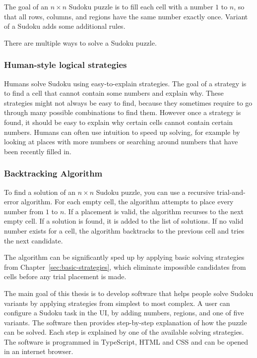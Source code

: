 

The goal of an $n \times n$ Sudoku puzzle is to fill each cell with a number $1$ to $n$,
so that all rows, columns, and regions have the same number exactly once.
Variant of a Sudoku adds some additional rules.


There are multiple ways to solve a Sudoku puzzle.

\subsubsection*{Human-style logical strategies}

Humans solve Sudoku using easy-to-explain strategies.
The goal of a strategy is to find a cell that cannot contain some numbers and explain why.
These strategies might not always be easy to find,
because they sometimes require to go through many possible combinations to find them.
However once a strategy is found, it should be easy to explain why certain cells cannot contain certain numbers.
Humans can often use intuition to speed up solving,
for example by looking at places with more numbers or searching around numbers that have been recently filled in.

\subsubsection*{Backtracking Algorithm}

To find a solution of an $n \times n$ Sudoku puzzle, you can use a recursive trial-and-error algorithm.
For each empty cell, the algorithm attempts to place every number from $1$ to $n$.
If a placement is valid, the algorithm recurses to the next empty cell.
If a solution is found, it is added to the list of solutions.
If no valid number exists for a cell, the algorithm backtracks to the previous cell and tries the next candidate.

The algorithm can be significantly sped up by applying basic solving strategies from Chapter~\ref{sec:basic-strategies},
which eliminate impossible candidates from cells before any trial placement is made.


The main goal of this thesis is to develop software that helps people solve Sudoku variants
by applying strategies from simplest to most complex.
A user can configure a Sudoku task in the UI, by adding numbers, regions, and one of five variants.
The software then provides step-by-step explanation of how the puzzle can be solved.
Each step is explained by one of the available solving strategies.
The software is programmed in TypeScript, HTML and CSS and can be opened in an internet browser.

